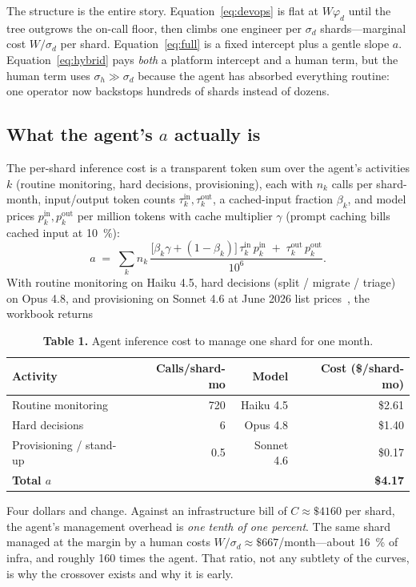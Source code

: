 \documentclass[11pt]{article}
\newcommand{\agentcost}{a}
\begin{document}
The structure is the entire story. Equation~\eqref{eq:devops} is flat at $W\varphi_d$ until the tree
outgrows the on-call floor, then climbs one engineer per $\sigma_d$ shards---marginal cost
$W/\sigma_d$ per shard. Equation~\eqref{eq:full} is a fixed intercept plus a gentle slope
$\agentcost$. Equation~\eqref{eq:hybrid} pays \emph{both} a platform intercept and a human term, but
the human term uses $\sigma_h\gg\sigma_d$ because the agent has absorbed everything routine: one
operator now backstops hundreds of shards instead of dozens.

\subsection{What the agent's \texorpdfstring{$\agentcost$}{a} actually is}
The per-shard inference cost is a transparent token sum over the agent's activities $k$ (routine
monitoring, hard decisions, provisioning), each with $n_k$ calls per shard-month, input/output token
counts $\tau^{\text{in}}_k,\tau^{\text{out}}_k$, a cached-input fraction $\beta_k$, and model prices
$p^{\text{in}}_k,p^{\text{out}}_k$ per million tokens with cache multiplier $\gamma$ (prompt caching
bills cached input at \SI{10}{\percent}):
\[
\agentcost \;=\; \sum_k n_k\,\frac{\bigl[\beta_k\gamma + (1-\beta_k)\bigr]\,\tau^{\text{in}}_k\,p^{\text{in}}_k
\;+\; \tau^{\text{out}}_k\,p^{\text{out}}_k}{10^6}.
\]
With routine monitoring on Haiku 4.5, hard decisions (split / migrate / triage) on Opus 4.8, and
provisioning on Sonnet 4.6 at June 2026 list prices~\cite{anthropicprice2026}, the workbook returns

\begin{table}[h]
\centering
\caption*{\textbf{Table 1.} Agent inference cost to manage one shard for one month.}
\begin{tabular}{@{}lrrr@{}}
\toprule
Activity & Calls/shard-mo & Model & Cost (\$/shard-mo) \\
\midrule
Routine monitoring   & \num{720} & Haiku 4.5  & \$2.61 \\
Hard decisions       & \num{6}   & Opus 4.8   & \$1.40 \\
Provisioning / stand-up & \num{0.5} & Sonnet 4.6 & \$0.17 \\
\midrule
\textbf{Total $\agentcost$} & & & \textbf{\$4.17} \\
\bottomrule
\end{tabular}
\end{table}

\noindent Four dollars and change. Against an infrastructure bill of $C\approx\$\num{4160}$ per
shard, the agent's management overhead is \emph{one tenth of one percent}. The same shard managed at
the margin by a human costs $W/\sigma_d\approx\$\num{667}$/month---about \SI{16}{\percent} of infra,
and roughly \num{160} times the agent. That ratio, not any subtlety of the curves, is why the
crossover exists and why it is early.
\end{document}
